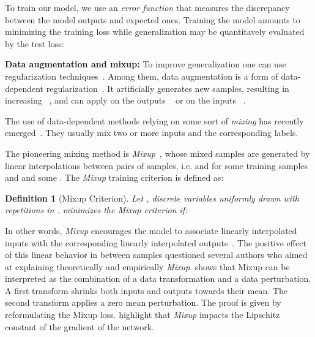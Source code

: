 \documentclass[twoside]{article}
\numberwithin{intassumption}{assumption}
\newtheorem{definition}{Definition}[section]
\begin{document}
To train our model, we use an \emph{error function}  that measures the discrepancy between the model outputs and expected ones. Training the model amounts to minimizing the training loss while generalization may be quantitavely evaluated by the test loss: 


\textbf{Data augmentation and mixup:}
To improve generalization one can use regularization techniques~\citep{goodfellow2016deep}. Among them, data augmentation is a form of data-dependent regularization~\citep{guo2019mixup}.
It artificially generates new samples, resulting in increasing ~\citep{dataaugmentation}, and can apply on the outputs ~\citep{noisylabel} or on the inputs ~\citep{colorful,cutoutorig,cutmixorig,autoaugment,horizontalflip,horizontalflip3}.









The use of data-dependent methods relying on some sort of \emph{mixing} has recently emerged~\citep{zhang2017mixup,manifold,cutmixorig,cutoutorig,augmix,puzzlemix,remix,automix,stackmix,batchmixup,mixmo}. They usually mix two or more inputs and the corresponding labels.
 
The pioneering mixing method is \emph{Mixup}~\citep{zhang2017mixup}, whose mixed samples  are generated by linear interpolations between pairs of samples, i.e.  and  for some training samples  and  and some  . The \emph{Mixup} training criterion is defined as:
\begin{definition}[Mixup Criterion] Let ,  discrete variables uniformly drawn with repetitions in .  minimizes the Mixup criterion if: 


\end{definition}

In other words, \emph{Mixup} encourages the model  to associate linearly interpolated inputs with the corresponding linearly interpolated outputs~\citep{zhang2017mixup}. The positive effect of this linear behavior in between samples questioned several authors who aimed at explaining theoretically and empirically \emph{Mixup}. \citet{carratino2020mixup} shows that Mixup can be interpreted as the combination of a data transformation and a data perturbation. A first transform shrinks both inputs and outputs towards their mean. The second transform applies a zero mean perturbation. The proof is given by reformulating the Mixup loss. \citet{Lipmixup} highlight that \emph{Mixup} impacts the Lipschitz constant  of the gradient of the network.
\end{document}
